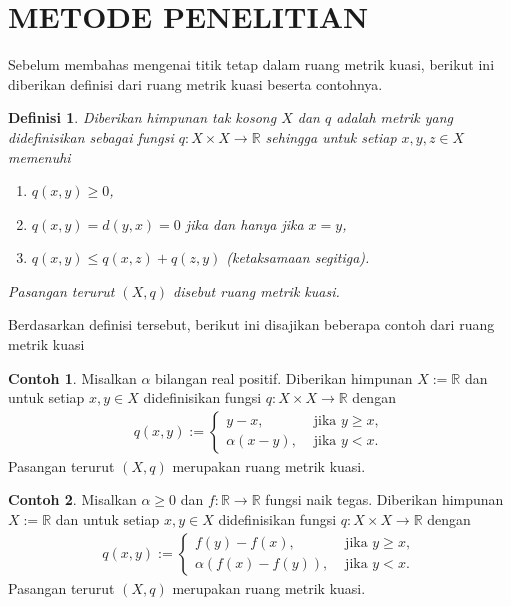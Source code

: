 \documentclass[journal]{IEEEtran}
\newtheorem{defn}{Definisi}[section]
\theoremstyle{definition}
\newtheorem{con}{Contoh}[section]
\theoremstyle{definition}
\theoremstyle{plain}
\newcommand{\R}{\mathbb{R}}
\begin{document}
    \section{METODE PENELITIAN}
    \hskip 0.5cm Sebelum membahas mengenai titik tetap dalam ruang metrik kuasi, berikut ini diberikan definisi dari ruang metrik kuasi beserta contohnya.
\begin{defn}\label{ruangmetrikkuasi}
    \cite{JuliaCollins2007} Diberikan himpunan tak kosong $X$ dan $q$ adalah metrik yang didefinisikan sebagai fungsi $q :X\times X\rightarrow \R$ sehingga untuk setiap $x,y,z\in X$ memenuhi 
    \begin{enumerate}
        \item[(M1)] $q(x,y)\geq 0$,
        \item[(M2)] $q(x,y)=d(y,x)=0$ jika dan hanya jika $x=y$,
        \item[(M4)] $q(x,y)\leq q(x,z)+q(z,y)$ (ketaksamaan segitiga).
    \end{enumerate}
    Pasangan terurut $(X,q)$ disebut ruang metrik kuasi.
\end{defn}
Berdasarkan definisi tersebut, berikut ini disajikan beberapa contoh dari ruang metrik kuasi
\begin{con}\label{con:ruangmetrikkuasi1}
    \cite{JuliaCollins2007} Misalkan $\alpha$ bilangan real positif. Diberikan himpunan $X:=\R$ dan untuk setiap $x,y\in X$ didefinisikan fungsi $q:X\times X\rightarrow \R$ dengan 
    \begin{align}
        q(x,y) := \begin{cases}
        y-x, &\text{ jika } y\geq x,\\
        \alpha(x-y), &\text{ jika } y<x.
        \end{cases} \label{fungsicon:ruangmetrikkuasi1}
    \end{align}
    Pasangan terurut $(X,q)$ merupakan ruang metrik kuasi.
\end{con}
\begin{con}\label{con:ruangmetrikkuasi2}
    Misalkan $\alpha\geq 0$ dan $f:\R\rightarrow\R$ fungsi naik tegas. Diberikan himpunan $X:=\R$ dan untuk setiap $x,y\in X$ didefinisikan fungsi $q:X\times X\rightarrow \R$ dengan 
    \begin{align}
        q(x,y) := \begin{cases}
        f(y)-f(x), &\text{ jika } y\geq x,\\
        \alpha(f(x)-f(y)), &\text{ jika } y<x.
        \end{cases} \label{fungsicon:ruangmetrikkuasi2}
    \end{align}
    Pasangan terurut $(X,q)$ merupakan ruang metrik kuasi.
\end{con}
\end{document}

